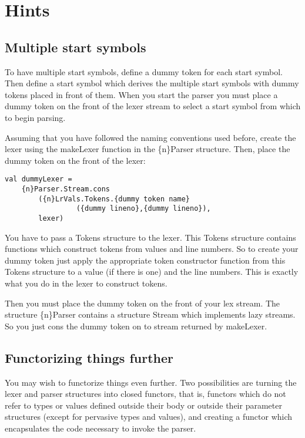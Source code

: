 \section{Hints}
\subsection{Multiple start symbols}
To have multiple start symbols, define a dummy token for each
start symbol.  Then define a start symbol which derives the
multiple start symbols with dummy tokens placed in front of
them.  When you start the parser you must place a dummy token
on the front of the lexer stream to select a start symbol
from which to begin parsing.

Assuming that you have followed the naming conventions used before,
create the lexer using the makeLexer function in the \{n\}Parser structure.
Then, place the dummy token on the front of the lexer:
\begin{tt}
\begin{verbatim}
val dummyLexer =
    {n}Parser.Stream.cons
        ({n}LrVals.Tokens.{dummy token name}
                 ({dummy lineno},{dummy lineno}),
        lexer)
\end{verbatim}
\end{tt}
   You have to pass a Tokens structure to the lexer.  This Tokens structure
contains functions which construct tokens from values and line numbers.
So to create your dummy token just apply the appropriate token constructor
function from this Tokens structure to a value (if there is one) and the
line numbers.   This is exactly what you do in the lexer to construct tokens.

   Then you must place the dummy token on the front of your lex stream.
The structure \{n\}Parser contains a structure Stream which implements
lazy streams.  So you just cons the dummy token on to stream returned
by makeLexer.
\subsection{Functorizing things further}

You may wish to functorize things even further.  Two possibilities
are turning the lexer and parser structures into closed functors,
that is, functors which do not refer to types or values defined
outside their body or outside their parameter structures (except
for pervasive types and values), and creating a functor which
encapsulates the code necessary to invoke the parser.

